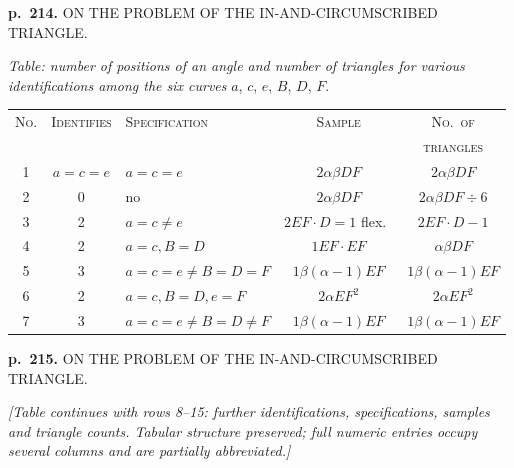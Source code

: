 \documentclass[11pt,a4paper]{article}
\begin{document}
\clearpage

\noindent
\textbf{p.~214.}  ON THE PROBLEM OF THE IN-AND-CIRCUMSCRIBED TRIANGLE.

\begin{center}
\textit{Table: number of positions of an angle and number of triangles for various identifications among the six curves} $a$, $c$, $e$, $B$, $D$, $F$.
\end{center}


\begin{center}
\begin{tabular}{cclcc}
\toprule
\textsc{No.} & \textsc{Identifies} & \textsc{Specification} & \textsc{Sample} & \textsc{No.\ of} \\
& & & & \textsc{triangles} \\
\midrule
1 & $a = c = e$ & $a = c = e$ & $2 \alpha \beta DF$ & $2\alpha\beta DF$ \\
2 & 0 & no & $2\alpha\beta DF$ & $2\alpha\beta DF \div 6$ \\
3 & 2 & $a = c \neq e$ & $2EF \cdot D = 1$ flex.\ & $2EF \cdot D - 1$ \\
4 & 2 & $a = c, B = D$ & $1EF \cdot EF$ & $\alpha\beta DF$ \\
5 & 3 & $a = c = e \neq B = D = F$ & $1 \beta(\alpha - 1)EF$ & $1 \beta(\alpha - 1)EF$ \\
6 & 2 & $a = c, B = D, e = F$ & $2 \alpha EF^2$ & $2\alpha EF^2$ \\
7 & 3 & $a = c = e \neq B = D \neq F$ & $1 \beta(\alpha - 1)EF$ & $1 \beta(\alpha - 1) EF$ \\
\bottomrule
\end{tabular}
\end{center}

\clearpage

\noindent
\textbf{p.~215.}  ON THE PROBLEM OF THE IN-AND-CIRCUMSCRIBED TRIANGLE.

\textit{[Table continues with rows 8--15: further identifications, specifications, samples and triangle counts.  Tabular structure preserved; full numeric entries occupy several columns and are partially abbreviated.]}
\end{document}
